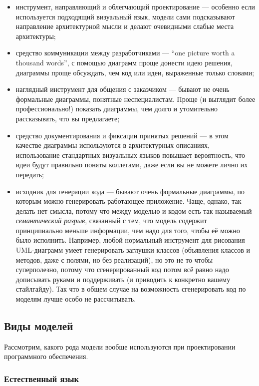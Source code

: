 \documentclass[a5paper]{article}
\begin{document}
\begin{itemize}
	\item инструмент, направляющий и облегчающий проектирование --- особенно если используется подходящий визуальный язык, модели сами подсказывают направление архитектурной мысли и делают очевидными слабые места архитектуры;
	\item средство коммуникации между разработчиками --- ``one picture worth a thousand words'', с помощью диаграмм проще донести идею решения, диаграммы проще обсуждать, чем код или идеи, выраженные только словами;
	\item наглядный инструмент для общения с заказчиком --- бывают не очень формальные диаграммы, понятные неспециалистам. Проще (и выглядит более профессионально!) показать диаграммы, чем долго и утомительно рассказывать, что вы предлагаете;
	\item средство документирования и фиксации принятых решений --- в этом качестве диаграммы используются в архитектурных описаниях, использование стандартных визуальных языков повышает вероятность, что идеи будут правильно поняты коллегами, даже если вы не можете лично их передать;
	\item исходник для генерации кода --- бывают очень формальные диаграммы, по которым можно генерировать работающее приложение. Чаще, однако, так делать нет смысла, потому что между моделью и кодом есть так называемый \textit{семантический разрыв}, связанный с тем, что модель содержит принципиально меньше информации, чем надо для того, чтобы её можно было исполнить. Например, любой нормальный инструмент для рисования UML-диаграмм умеет генерировать заглушки классов (объявления классов и методов, даже с полями, но без реализаций), но это не то чтобы суперполезно, потому что сгенерированный код потом всё равно надо дописывать руками и поддерживать (и приводить к конкретно вашему стайлгайду). Так что в общем случае на возможность сгенерировать код по моделям лучше особо не рассчитывать.
\end{itemize}

\subsection{Виды моделей}

Рассмотрим, какого рода модели вообще используются при проектировании программного обеспечения.

\subsubsection{Естественный язык}
\end{document}

